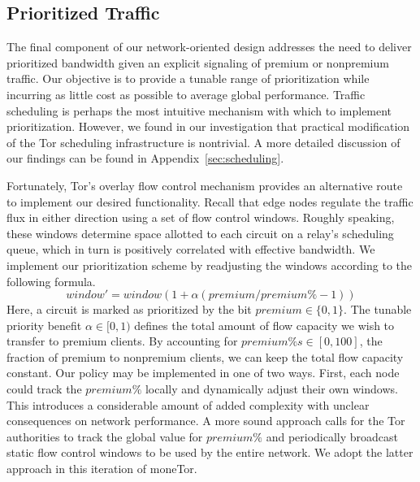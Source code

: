 \subsection{Prioritized Traffic}
\label{subsub:prioritized}

The final component of our network-oriented design addresses the need to deliver
prioritized bandwidth given an explicit signaling of premium or nonpremium
traffic. Our objective is to provide a tunable range of prioritization while
incurring as little cost as possible to average global performance. Traffic
scheduling is perhaps the most intuitive mechanism with which to implement
prioritization. However, we found in our investigation that practical
modification of the Tor scheduling infrastructure is nontrivial. A more detailed
discussion of our findings can be found in Appendix~\ref{sec:scheduling}.

Fortunately, Tor's overlay flow control mechanism provides an alternative route
to implement our desired functionality. Recall that edge nodes regulate the
traffic flux in either direction using a set of flow control windows. Roughly
speaking, these windows determine space allotted to each circuit on a relay's
scheduling queue, which in turn is positively correlated with effective
bandwidth. We implement our prioritization scheme by readjusting the windows
according to the following formula.
\begin{equation}
  window' = window(1+ \alpha(premium / premium\% - 1))
  \label{eq:flow}
\end{equation}
Here, a circuit is marked as prioritized by the bit $premium \in \{0, 1\}$. The
tunable priority benefit $\alpha \in [0, 1)$ defines the total amount of flow
capacity we wish to transfer to premium clients. By accounting for
$premium\%s \in [0,100]$, the fraction of premium to nonpremium clients, we can
keep the total flow capacity constant. Our policy may be implemented in one of
two ways. First, each node could track the $premium\%$ locally and dynamically
adjust their own windows. This introduces a considerable amount of added
complexity with unclear consequences on network performance. A more sound
approach calls for the Tor authorities to track the global value for $premium\%$
and periodically broadcast static flow control windows to be used by the entire
network. We adopt the latter approach in this iteration of moneTor.
